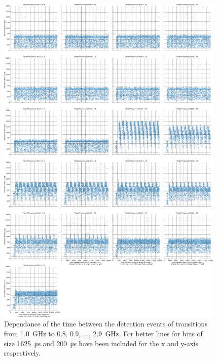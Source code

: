 \begin{figure}[]
    \centering
    \includegraphics[width=\columnwidth]{fig/ftalat_scatter_wait_transition_latency_hati_source_1.0.pdf}
    \caption{Dependance of the time between the detection events of transitions from \SI{1.0}{\GHz} to \SI{0.8}{}, \SI{0.9}{}, ..., \SI{2.9}{\GHz}. For better lines for bins of size \SI{1625}{\us} and \SI{200}{\us} have been included for the x and y-axis respectively.}
\end{figure}
